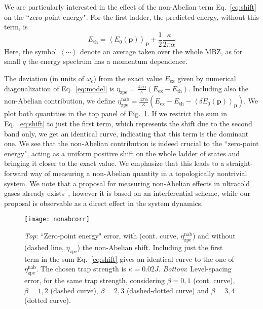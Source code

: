 \documentclass[twocolumn, 10pt, aps, superscriptaddress, floatfix, showpacs, pra, citeautoscript]{revtex4-1}
\newcommand{\vt}[1]{\mathbf{#1}}
\begin{document}
We are particularly interested in the effect of the non-Abelian term
Eq.~\eqref{eq:shift} on the ``zero-point energy". For the first
ladder, the predicted energy, without this term, is
\begin{equation}
  E_{\text{th}} = \left<E_0(\vt{p})\right>_{\vt{p}} + \frac{1}{2}\frac{\kappa}{2\pi\alpha}
\end{equation}
Here, the symbol $\left<\cdots\right>$ denote an average taken over
the whole MBZ, as for small $q$ the energy spectrum has a momentum
dependence.

The deviation (in units of $\omega_c$) from the exact value
$E_{\text{ex}}$ given by numerical diagonalization of
Eq.~\eqref{eq:model} is
$\eta_{\text{zpe}} = \frac{4\pi\alpha}{\kappa} (E_{\text{ex}} -
E_{\text{th}})$.
Including also the non-Abelian contribution, we define
$\eta_{\text{zpe}}^{\text{nab}} = \frac{4\pi\alpha}{\kappa}
(E_{\text{ex}} - E_{\text{th}} - \left<\delta
  E_0(\vt{p})\right>_{\vt{p}})$.
We plot both quantities in the top panel of Fig.~\ref{fig:zpe}. If we
restrict the sum in Eq.~\eqref{eq:shift} to just the first term, which
represents the shift due to the second band only, we get an identical
curve, indicating that this term is the dominant one.  We see that the
non-Abelian contribution is indeed crucial to the ``zero-point
energy", acting as a uniform positive shift on the whole ladder of
states and bringing it closer to the exact value. We emphasize that
this leads to a straight-forward way of measuring a non-Abelian
quantity in a topologically nontrivial system. We note that a proposal
for measuring non-Abelian effects in ultracold gases already
exists~\cite{Grusdt2014nonabelian}, however it is based on an
interferential scheme, while our proposal is observable as a direct
effect in the system dynamics.

\begin{figure}[htb]\centering
  \texttt{[image: nonabcorr]} %
  \caption{\emph{Top}: ``Zero-point energy" error, with (cont. curve,
    $\eta_{\text{zpe}}^{\text{nab}}$) and without (dashed line,
    $\eta_{\text{zpe}}$) the non-Abelian shift. Including just the
    first term in the sum Eq.~\eqref{eq:shift} gives an identical
    curve to the one of $\eta_{\text{zpe}}^{\text{nab}}$. The chosen
    trap strength is $\kappa = 0.02 J$.  \emph{Bottom}: Level-spacing
    error, for the same trap strength, considering $\beta = 0,1$
    (cont. curve), $\beta = 1,2$ (dashed curve), $\beta = 2,3$
    (dashed-dotted curve) and $\beta = 3,4$ (dotted curve).}
  \label{fig:zpe}
\end{figure}
\end{document}

